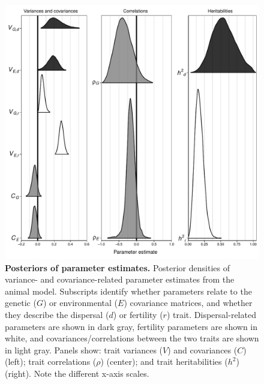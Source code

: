 \documentclass[11pt]{article}
\begin{document}
\begin{figure}[h!]
\centering
\includegraphics[width=0.9\linewidth]{Figures/corr_posteriors.pdf}
\caption[Posteriors of parameter estimates]
{\textbf{Posteriors of parameter estimates.} Posterior densities of variance- and covariance-related parameter estimates from the animal model. Subscripts identify whether parameters relate to the genetic ($G$) or environmental ($E$) covariance matrices, and whether they describe the dispersal ($d$) or fertility ($r$) trait. Dispersal-related parameters are shown in dark gray, fertility parameters are shown in white, and covariances/correlations between the two traits are shown in light gray. Panels show: trait variances ($V$) and covariances ($C$) (left); trait correlations ($\rho$) (center); and trait heritabilities ($h^{2}$) (right). Note the different x-axis scales.}\label{corr:posteriors}
\end{figure}

\newpage{}
\end{document}
